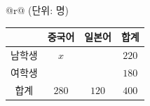 \begin{tabular}{@{}r@{}}
{\footnotesize (단위: 명)} \\[-1pt]
\begin{tabular}{|c|c|c|c|}
\hline
 & 중국어 & 일본어 & 합계 \\
\hline
남학생 & $x$ & & $220$ \\
\hline
여학생 & & & $180$ \\
\hline
합계 & $280$ & $120$ & $400$ \\
\hline
\end{tabular}
\end{tabular}
